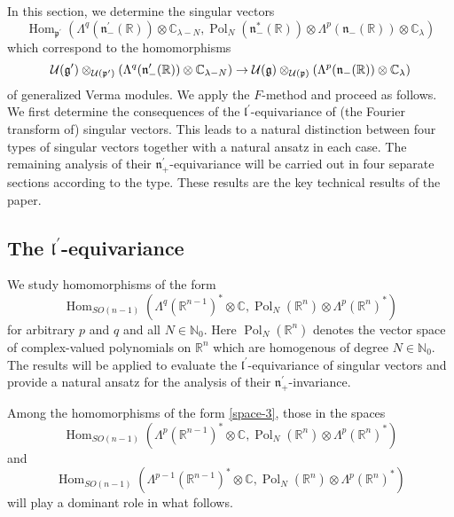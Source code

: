 \documentclass[a4paper,12pt,reqno]{amsart}
\numberwithin{theorem}{subsection}
\numberwithin{equation}{section}
\begin{document}
In this section, we determine the singular vectors
$$
   {\operatorname{Hom}}_{{{\mathfrak p}}^\prime}(\Lambda^q({{\mathfrak n}}_-^\prime({\mathbb{R}})) \otimes {\mathbb{C}}_{\lambda-N},
   {\operatorname{Pol}}_N({{\mathfrak n}}_-^*({\mathbb{R}})) \otimes \Lambda^p({{\mathfrak n}}_-({\mathbb{R}})) \otimes {\mathbb{C}}_\lambda)
$$
which correspond to the homomorphisms
\begin{equation*}
   {\fam2U}({{\mathfrak g}}^\prime) \otimes_{{\fam2U}({{\mathfrak p}}^\prime)}(\Lambda^{q}({{\mathfrak n}}_-^\prime({\mathbb{R}}))
   \otimes {\mathbb{C}}_{\lambda-N}) \to {\fam2U}({{\mathfrak g}})\otimes_{{\fam2U}({{\mathfrak p}})}(\Lambda^p({{\mathfrak n}}_-({\mathbb{R}})) \otimes {\mathbb{C}}_\lambda)
\end{equation*}
of generalized Verma modules. We apply the $F$-method and proceed as follows.
We first determine the consequences of the ${{\mathfrak l}}^\prime$-equivariance of (the
Fourier transform of) singular vectors. This leads to a natural distinction
between four types of singular vectors together with a natural ansatz in each
case. The remaining analysis of their ${{\mathfrak n}}_+^\prime$-equivariance will be
carried out in four separate sections according to the type. These results are
the key technical results of the paper.

\subsection{The ${{\mathfrak l}}^\prime$-equivariance}\label{first-test}

We study homomorphisms of the form
\begin{equation}\label{space-3}
   {\operatorname{Hom}}_{SO(n-1)}(\Lambda^q({\mathbb{R}}^{n-1})^* \otimes {\mathbb{C}}, {\operatorname{Pol}}_N({\mathbb{R}}^n) \otimes \Lambda^p({\mathbb{R}}^n)^*)
\end{equation}
for arbitrary $p$ and $q$ and all $N \in {\mathbb{N}}_0$. Here ${\operatorname{Pol}}_N({\mathbb{R}}^n)$ denotes the
vector space of complex-valued polynomials on ${\mathbb{R}}^n$ which are homogenous of
degree $N \in {\mathbb{N}}_0$. The results will be applied to evaluate the ${{\mathfrak l}}^
\prime$-equivariance of singular vectors and provide a natural ansatz for the
analysis of their ${{\mathfrak n}}_+^\prime$-invariance.

Among the homomorphisms of the form \eqref{space-3}, those in the spaces
\begin{equation}\label{space-1}
   {\operatorname{Hom}}_{SO(n-1)}(\Lambda^p({\mathbb{R}}^{n-1})^* \otimes {\mathbb{C}}, {\operatorname{Pol}}_N({\mathbb{R}}^n) \otimes \Lambda^p({\mathbb{R}}^n)^*)
\end{equation}
and
\begin{equation}\label{space-2}
   {\operatorname{Hom}}_{SO(n-1)}(\Lambda^{p-1}({\mathbb{R}}^{n-1})^* \otimes {\mathbb{C}},{\operatorname{Pol}}_N({\mathbb{R}}^n)\otimes \Lambda^p({\mathbb{R}}^n)^*)
\end{equation}
will play a dominant role in what follows.
\end{document}
